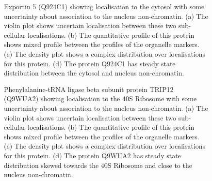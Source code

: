 \documentclass[10pt,letterpaper]{article}\usepackage[]{graphicx}\usepackage[]{color}
\begin{document}
\begin{figure}[!p]
  \centering
  \begin{subfigure}[t]{0.5\textwidth}
    \centering

  \end{subfigure}%
  \begin{subfigure}[t]{0.5\textwidth}
    \centering

  \end{subfigure}
  \vspace{1cm}
  \begin{subfigure}[t]{0.5\textwidth}
    \centering

  \end{subfigure}%
  \begin{subfigure}[t]{0.5\textwidth}
    \centering

  \end{subfigure}

  \caption{Exportin 5 (Q924C1) showing localisation to the cytosol
    with some uncertainty about association to the nucleus
    non-chromatin.  (a) The violin plot shows uncertain localisation
    between these two sub-cellular localisations. (b) The quantitative
    profile of this protein shows mixed profile between the profiles
    of the organelle markers. (c) The density plot shows a complex
    distribution over localisations for this protein. (d) The protein
    Q924C1 has steady state distribution between the cytosol and
    nucleus non-chromatin.}
  \label{fig:Q924C1}
\end{figure}

\begin{figure}[!p]
  \centering
  \begin{subfigure}[t]{0.5\textwidth}
    \centering

  \end{subfigure}%
  \begin{subfigure}[t]{0.5\textwidth}
    \centering

  \end{subfigure}
  \vspace{1cm}
  \begin{subfigure}[t]{0.5\textwidth}
    \centering

  \end{subfigure}%
  \begin{subfigure}[t]{0.5\textwidth}
    \centering

  \end{subfigure}

  \caption{Phenylalanine-tRNA ligase beta subunit protein TRIP12
    (Q9WUA2) showing localisation to the 40S Ribosome with some
    uncertainty about association to the nucleus non-chromatin.  (a)
    The violin plot shows uncertain localisation between these two
    sub-cellular localisations. (b) The quantitative profile of this
    protein shows mixed profile between the profiles of the organelle
    markers. (c) The density plot shows a complex distribution over
    localisations for this protein. (d) The protein Q9WUA2 has steady
    state distribution skewed towards the 40S Ribosome and close to
    the nucleus non-chromatin.}
  \label{fig:Q9WUA2}
\end{figure}
\end{document}
